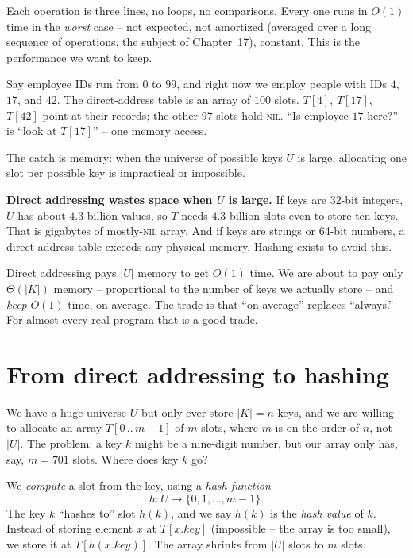 Each operation is three lines, no loops, no comparisons. Every one runs in $O(1)$ time in the \emph{worst} case -- not expected, not amortized (averaged over a long sequence of operations, the subject of Chapter~17), constant. This is the performance we want to keep.

\begin{example}
Say employee IDs run from $0$ to $99$, and right now we employ people with IDs $4$, $17$, and $42$. The direct-address table is an array of $100$ slots. $T[4]$, $T[17]$, $T[42]$ point at their records; the other $97$ slots hold \textsc{nil}. ``Is employee $17$ here?'' is ``look at $T[17]$'' -- one memory access.
\end{example}

The catch is memory: when the universe of possible keys $U$ is large, allocating one slot per possible key is impractical or impossible.

\begin{trapbox}
\textbf{Direct addressing wastes space when $U$ is large.} If keys are 32-bit integers, $U$ has about $4.3$ billion values, so $T$ needs $4.3$ billion slots even to store ten keys. That is gigabytes of mostly-\textsc{nil} array. And if keys are strings or 64-bit numbers, a direct-address table exceeds any physical memory. Hashing exists to avoid this.
\end{trapbox}

\begin{intuitionbox}
Direct addressing pays $|U|$ memory to get $O(1)$ time. We are about to pay only $\Theta(|K|)$ memory -- proportional to the number of keys we actually store -- and \emph{keep} $O(1)$ time, on average. The trade is that ``on average'' replaces ``always.'' For almost every real program that is a good trade.
\end{intuitionbox}

\section{From direct addressing to hashing}

We have a huge universe $U$ but only ever store $|K| = n$ keys, and we are willing to allocate an array $T[0\,..\,m-1]$ of $m$ slots, where $m$ is on the order of $n$, not $|U|$. The problem: a key $k$ might be a nine-digit number, but our array only has, say, $m = 701$ slots. Where does key $k$ go?

We \emph{compute} a slot from the key, using a \emph{hash function}
\[
  h : U \to \{0, 1, \dots, m-1\}.
\]
The key $k$ ``hashes to'' slot $h(k)$, and we say $h(k)$ is the \emph{hash value} of $k$. Instead of storing element $x$ at $T[x.key]$ (impossible -- the array is too small), we store it at $T[h(x.key)]$. The array shrinks from $|U|$ slots to $m$ slots.

